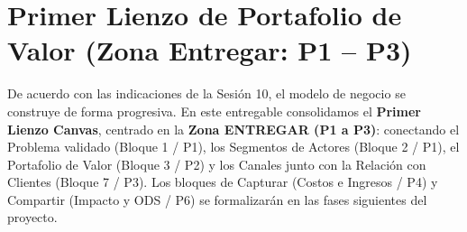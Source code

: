 \documentclass[11pt,a4paper]{article}
\begin{document}
\section{Primer Lienzo de Portafolio de Valor (Zona Entregar: P1 -- P3)}

\begin{tcolorbox}[colback=primary!5,colframe=primary,title={\textbf{Estructura Metodol\'ogica del Primer Lienzo}}]
De acuerdo con las indicaciones de la Sesi\'on 10, el modelo de negocio se construye de forma progresiva. En este entregable consolidamos el \textbf{Primer Lienzo Canvas}, centrado en la \textbf{Zona ENTREGAR (P1 a P3)}: conectando el Problema validado (Bloque 1 / P1), los Segmentos de Actores (Bloque 2 / P1), el Portafolio de Valor (Bloque 3 / P2) y los Canales junto con la Relaci\'on con Clientes (Bloque 7 / P3). Los bloques de Capturar (Costos e Ingresos / P4) y Compartir (Impacto y ODS / P6) se formalizar\'an en las fases siguientes del proyecto.
\end{tcolorbox}

\vspace{0.4cm}
\end{document}
